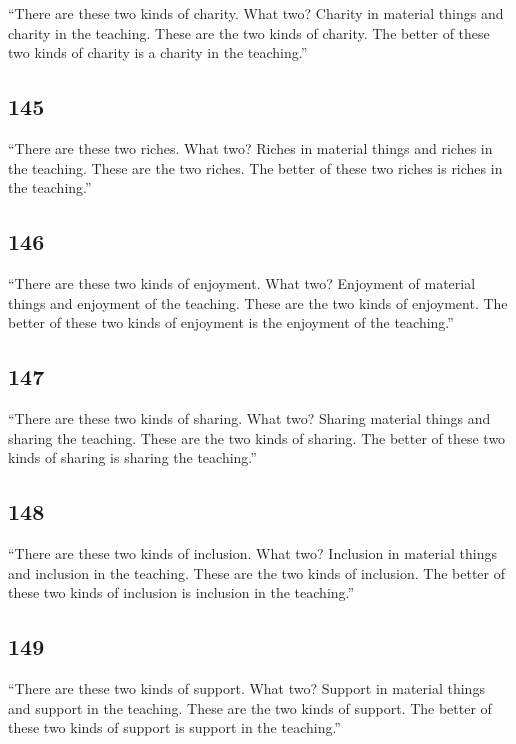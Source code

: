 \documentclass[12pt,openany]{book}%
\begin{document}
“There are these two kinds of charity. What two? Charity in material things and charity in the teaching. These are the two kinds of charity. The better of these two kinds of charity is a charity in the teaching.” 

\subsection*{145 }

“There are these two riches. What two? Riches in material things and riches in the teaching. These are the two riches. The better of these two riches is riches in the teaching.” 

\subsection*{146 }

“There are these two kinds of enjoyment. What two? Enjoyment of material things and enjoyment of the teaching. These are the two kinds of enjoyment. The better of these two kinds of enjoyment is the enjoyment of the teaching.” 

\subsection*{147 }

“There are these two kinds of sharing. What two? Sharing material things and sharing the teaching. These are the two kinds of sharing. The better of these two kinds of sharing is sharing the teaching.” 

\subsection*{148 }

“There are these two kinds of inclusion. What two? Inclusion in material things and inclusion in the teaching. These are the two kinds of inclusion. The better of these two kinds of inclusion is inclusion in the teaching.” 

\subsection*{149 }

“There are these two kinds of support. What two? Support in material things and support in the teaching. These are the two kinds of support. The better of these two kinds of support is support in the teaching.” 
\end{document}
